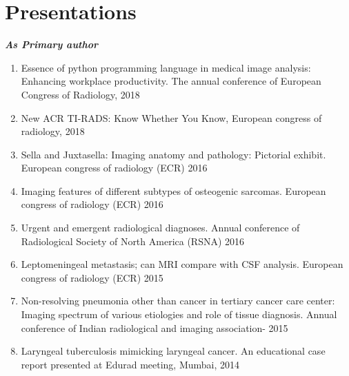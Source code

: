 \documentclass[a4paper,10pt]{article}
\begin{document}
\section{Presentations}
\textbf{\textit{As Primary author}}
\begin{enumerate}
  \vspace{-0.1cm}\item Essence of python programming language in medical image analysis: Enhancing workplace productivity. The annual conference of European Congress of Radiology, 2018
  \vspace{-0.1cm}\item New ACR TI-RADS: Know Whether You Know, European congress of radiology, 2018
  \vspace{-0.1cm}\item Sella and Juxtasella: Imaging anatomy and pathology: Pictorial exhibit. European congress of radiology (ECR) 2016
  \vspace{-0.1cm}\item Imaging features of different subtypes of osteogenic sarcomas. European congress of radiology (ECR) 2016
  \vspace{-0.1cm}\item Urgent and emergent radiological diagnoses. Annual conference of Radiological Society of North America (RSNA) 2016
  \vspace{-0.1cm}\item Leptomeningeal metastasis; can MRI compare with CSF analysis. European congress of radiology (ECR) 2015
  \vspace{-0.1cm}\item Non-resolving pneumonia other than cancer in tertiary cancer care center: Imaging spectrum of various etiologies and role of tissue diagnosis.  Annual conference of Indian radiological and imaging association- 2015
  \vspace{-0.1cm}\item Laryngeal tuberculosis mimicking laryngeal cancer. An educational case report presented at Edurad meeting, Mumbai, 2014
\end{enumerate}
\end{document}

